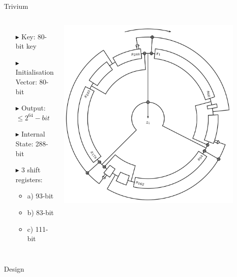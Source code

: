 \documentclass[10pt, compress]{beamer}
\begin{document}
\begin{frame}{Trivium}
\begin{columns}
\begin{itemize}[itemsep=0.5cm]
\item[$\blacktriangleright$] Key: 80-bit key
\item[$\blacktriangleright$] Initialisation Vector: 80-bit
\item[$\blacktriangleright$] Output: $\leq2^{64}-bit$
\item[$\blacktriangleright$] Internal State: 288-bit
\item[$\blacktriangleright$] 3 shift registers:
\begin{itemize}
\item a) 93-bit
\item b) 83-bit
\item c) 111-bit
\end{itemize}
\end{itemize}
\includegraphics[width=0.9\textwidth]{figures/round.png}\cite{circle}
\end{columns}
\end{frame}

\begin{frame}{Design}
\begin{figure}

\end{figure}
\end{frame}
\end{document}
